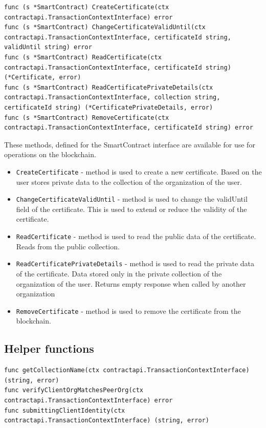 \documentclass[12pt]{article}
\begin{document}
\begin{lstlisting}[language=Golang]
func (s *SmartContract) CreateCertificate(ctx contractapi.TransactionContextInterface) error
func (s *SmartContract) ChangeCertificateValidUntil(ctx contractapi.TransactionContextInterface, certificateId string, validUntil string) error
func (s *SmartContract) ReadCertificate(ctx contractapi.TransactionContextInterface, certificateId string) (*Certificate, error)
func (s *SmartContract) ReadCertificatePrivateDetails(ctx contractapi.TransactionContextInterface, collection string, certificateId string) (*CertificatePrivateDetails, error)
func (s *SmartContract) RemoveCertificate(ctx contractapi.TransactionContextInterface, certificateId string) error
\end{lstlisting}

These methods, defined for the SmartContract interface are available for use for operations on the blockchain.

\begin{itemize}
    \item \texttt{CreateCertificate} - method is used to create a new certificate. Based on the user stores private data to the collection of the organization of the user.
    \item \texttt{ChangeCertificateValidUntil} - method is used to change the validUntil field of the certificate. This is used to extend or reduce the validity of the certificate.
    \item \texttt{ReadCertificate} - method is used to read the public data of the certificate. Reads from the public collection.
    \item \texttt{ReadCertificatePrivateDetails} - method is used to read the private data of the certificate. Data stored only in the private collection of the organization of the user. Returns empty response when called by another organization
    \item \texttt{RemoveCertificate} - method is used to remove the certificate from the blockchain.
\end{itemize}

\subsection{Helper functions}

\begin{lstlisting}[language=Golang]
func getCollectionName(ctx contractapi.TransactionContextInterface) (string, error)
func verifyClientOrgMatchesPeerOrg(ctx contractapi.TransactionContextInterface) error
func submittingClientIdentity(ctx contractapi.TransactionContextInterface) (string, error)
\end{lstlisting}
\end{document}
